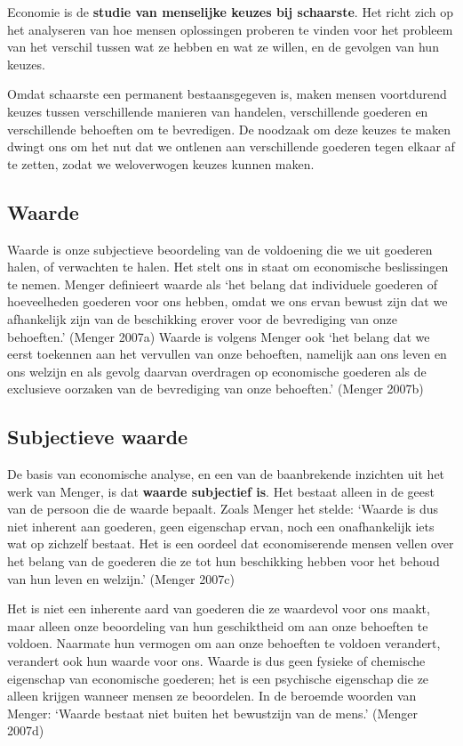 \documentclass[
  a5paper,
  smalldemyvopaper,11pt,twoside,onecolumn,openright,extrafontsizes,
hidelinks]{memoir}
\begin{document}
Economie is de \textbf{studie van menselijke keuzes bij schaarste}. Het
richt zich op het analyseren van hoe mensen oplossingen proberen te
vinden voor het probleem van het verschil tussen wat ze hebben en wat ze
willen, en de gevolgen van hun keuzes.

Omdat schaarste een permanent bestaansgegeven is, maken mensen
voortdurend keuzes tussen verschillende manieren van handelen,
verschillende goederen en verschillende behoeften om te bevredigen. De
noodzaak om deze keuzes te maken dwingt ons om het nut dat we ontlenen
aan verschillende goederen tegen elkaar af te zetten, zodat we
weloverwogen keuzes kunnen maken.

\subsection{Waarde}\label{waarde}

Waarde is onze subjectieve beoordeling van de voldoening die we uit
goederen halen, of verwachten te halen. Het stelt ons in staat om
economische beslissingen te nemen. Menger definieert waarde als `het
belang dat individuele goederen of hoeveelheden goederen voor ons
hebben, omdat we ons ervan bewust zijn dat we afhankelijk zijn van de
beschikking erover voor de bevrediging van onze behoeften.' (Menger
2007a) Waarde is volgens Menger ook `het belang dat we eerst toekennen
aan het vervullen van onze behoeften, namelijk aan ons leven en ons
welzijn en als gevolg daarvan overdragen op economische goederen als de
exclusieve oorzaken van de bevrediging van onze behoeften.' (Menger
2007b)

\subsection{Subjectieve waarde}\label{subjectieve-waarde}

De basis van economische analyse, en een van de baanbrekende inzichten
uit het werk van Menger, is dat \textbf{waarde subjectief is}. Het
bestaat alleen in de geest van de persoon die de waarde bepaalt. Zoals
Menger het stelde: `Waarde is dus niet inherent aan goederen, geen
eigenschap ervan, noch een onafhankelijk iets wat op zichzelf bestaat.
Het is een oordeel dat economiserende mensen vellen over het belang van
de goederen die ze tot hun beschikking hebben voor het behoud van hun
leven en welzijn.' (Menger 2007c)

Het is niet een inherente aard van goederen die ze waardevol voor ons
maakt, maar alleen onze beoordeling van hun geschiktheid om aan onze
behoeften te voldoen. Naarmate hun vermogen om aan onze behoeften te
voldoen verandert, verandert ook hun waarde voor ons. Waarde is dus geen
fysieke of chemische eigenschap van economische goederen; het is een
psychische eigenschap die ze alleen krijgen wanneer mensen ze
beoordelen. In de beroemde woorden van Menger: `Waarde bestaat niet
buiten het bewustzijn van de mens.' (Menger 2007d)
\end{document}
